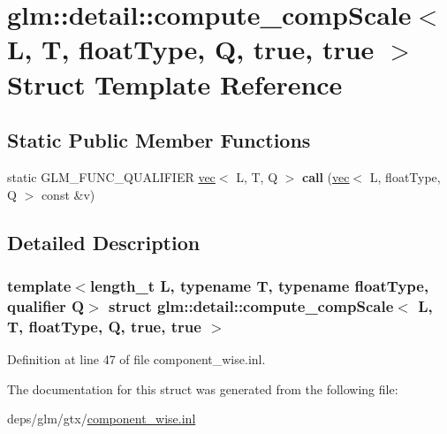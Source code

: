 \hypertarget{structglm_1_1detail_1_1compute__compScale_3_01L_00_01T_00_01floatType_00_01Q_00_01true_00_01true_01_4}{}\section{glm\+:\+:detail\+:\+:compute\+\_\+comp\+Scale$<$ L, T, float\+Type, Q, true, true $>$ Struct Template Reference}
\label{structglm_1_1detail_1_1compute__compScale_3_01L_00_01T_00_01floatType_00_01Q_00_01true_00_01true_01_4}
\subsection*{Static Public Member Functions}
\begin{DoxyCompactItemize}
\item 
\mbox{\label{structglm_1_1detail_1_1compute__compScale_3_01L_00_01T_00_01floatType_00_01Q_00_01true_00_01true_01_4_a49d34acc164a29cf170f74fb96eaa84d}} 
static G\+L\+M\+\_\+\+F\+U\+N\+C\+\_\+\+Q\+U\+A\+L\+I\+F\+I\+ER \hyperlink{structglm_1_1vec}{vec}$<$ L, T, Q $>$ {\bfseries call} (\hyperlink{structglm_1_1vec}{vec}$<$ L, float\+Type, Q $>$ const \&v)
\end{DoxyCompactItemize}


\subsection{Detailed Description}
\subsubsection*{template$<$length\+\_\+t L, typename T, typename float\+Type, qualifier Q$>$\newline
struct glm\+::detail\+::compute\+\_\+comp\+Scale$<$ L, T, float\+Type, Q, true, true $>$}



Definition at line 47 of file component\+\_\+wise.\+inl.



The documentation for this struct was generated from the following file\+:\begin{DoxyCompactItemize}
\item 
deps/glm/gtx/\hyperlink{component__wise_8inl}{component\+\_\+wise.\+inl}\end{DoxyCompactItemize}
